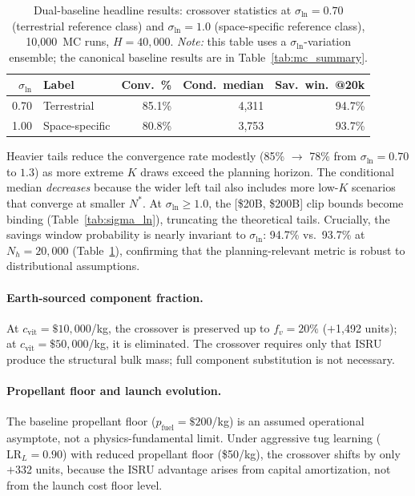 \documentclass[preprint,12pt]{elsarticle}
\begin{document}
\begin{table}[htbp]
\centering
\caption{Dual-baseline headline results: crossover statistics at $\sigma_{\ln} = 0.70$ (terrestrial reference class) and $\sigma_{\ln} = 1.0$ (space-specific reference class), 10{,}000~MC runs, $H = 40{,}000$. \emph{Note:} this table uses a $\sigma_{\ln}$-variation ensemble; the canonical baseline results are in Table~\ref{tab:mc_summary}.}
\label{tab:dual_baseline}
\small
\begin{tabular}{@{}rlrrr@{}}
\toprule
$\sigma_{\ln}$ & Label & Conv.\ \% & Cond.\ median & Sav.\ win.\ @20k \\
\midrule
0.70 & Terrestrial & 85.1\% & 4{,}311 & 94.7\% \\
1.00 & Space-specific & 80.8\% & 3{,}753 & 93.7\% \\
\bottomrule
\end{tabular}
\end{table}

Heavier tails reduce the convergence rate modestly (85\% $\to$ 78\% from $\sigma_{\ln} = 0.70$ to $1.3$) as more extreme $K$ draws exceed the planning horizon. The conditional median \emph{decreases} because the wider left tail also includes more low-$K$ scenarios that converge at smaller $N^*$. At $\sigma_{\ln} \geq 1.0$, the [\$20B, \$200B] clip bounds become binding (Table~\ref{tab:sigma_ln}), truncating the theoretical tails. Crucially, the savings window probability is nearly invariant to $\sigma_{\ln}$: 94.7\% vs.\ 93.7\% at $N_h = 20{,}000$ (Table~\ref{tab:dual_baseline}), confirming that the planning-relevant metric is robust to distributional assumptions.

\paragraph{Earth-sourced component fraction.} At $c_{\mathrm{vit}} = \$10{,}000$/kg, the crossover is preserved up to $f_v = 20\%$ ($+$1{,}492 units); at $c_{\mathrm{vit}} = \$50{,}000$/kg, it is eliminated. The crossover requires only that ISRU produce the structural bulk mass; full component substitution is not necessary.

\paragraph{Propellant floor and launch evolution.} The baseline propellant floor ($p_{\mathrm{fuel}} = \$200$/kg) is an assumed operational asymptote, not a physics-fundamental limit. Under aggressive tug learning ($\mathrm{LR}_L = 0.90$) with reduced propellant floor (\$50/kg), the crossover shifts by only $+$332 units, because the ISRU advantage arises from capital amortization, not from the launch cost floor level.
\end{document}
